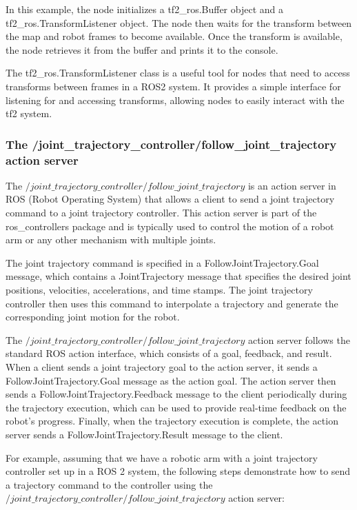 \documentclass[12pt,oneside]{article}
\begin{document}
In this example, the node initializes a tf2\_ros.Buffer object and a tf2\_ros.TransformListener object. The node then waits for the transform between the map and robot frames to become available. Once the transform is available, the node retrieves it from the buffer and prints it to the console.

The tf2\_ros.TransformListener class is a useful tool for nodes that need to access transforms between frames in a ROS2 system. It provides a simple interface for listening for and accessing transforms, allowing nodes to easily interact with the tf2 system.

\subsubsection{The /joint\_trajectory\_controller/follow\_joint\_trajectory action server}\label{ros2-joint-trajectory-controller}
The $/joint\_trajectory\_controller/follow\_joint\_trajectory$ is an action server in ROS (Robot Operating System) that allows a client to send a joint trajectory command to a joint trajectory controller. This action server is part of the ros\_controllers package and is typically used to control the motion of a robot arm or any other mechanism with multiple joints.

The joint trajectory command is specified in a FollowJointTrajectory.Goal message, which contains a JointTrajectory message that specifies the desired joint positions, velocities, accelerations, and time stamps. The joint trajectory controller then uses this command to interpolate a trajectory and generate the corresponding joint motion for the robot.

The $/joint\_trajectory\_controller/follow\_joint\_trajectory$ action server follows the standard ROS action interface, which consists of a goal, feedback, and result. When a client sends a joint trajectory goal to the action server, it sends a FollowJointTrajectory.Goal message as the action goal. The action server then sends a FollowJointTrajectory.Feedback message to the client periodically during the trajectory execution, which can be used to provide real-time feedback on the robot's progress. Finally, when the trajectory execution is complete, the action server sends a FollowJointTrajectory.Result message to the client.

For example, assuming that we have a robotic arm with a joint trajectory controller set up in a ROS 2 system, the following steps demonstrate how to send a trajectory command to the controller using the $/joint\_trajectory\_controller/follow\_joint\_trajectory$ action server:
\end{document}
